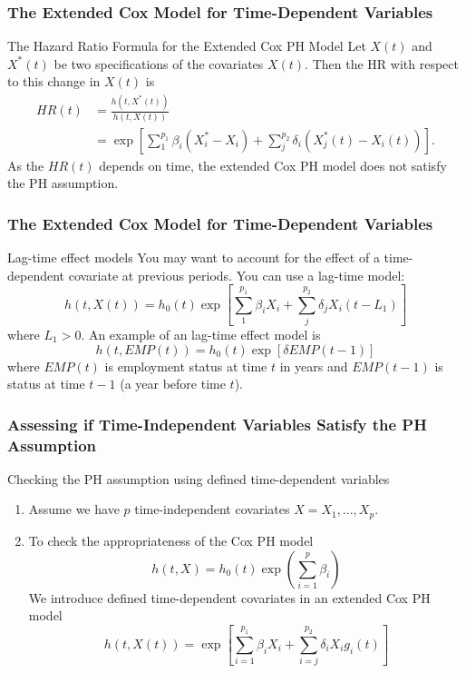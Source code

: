 \documentclass{beamer}
\theoremstyle{definition}
\begin{document}
\begin{frame}
\frametitle{The Extended Cox Model for Time-Dependent Variables}
\begin{block}{The Hazard Ratio Formula for the Extended Cox PH Model}
Let $X(t)$ and $X^*(t)$ be two specifications of the covariates $X(t)$. Then the HR with respect to this change in $X(t)$ is
\begin{align*}
HR(t) &= \frac{h(t,X^*(t))}{h(t,X(t))} \\
& = \exp\left[\sum_1^{p_1} \beta_i(X^*_i - X_i) + \sum_j^{p_2} \delta_i(X^*_j(t) - X_i(t))\right].
\end{align*}
As the $HR(t)$ depends on time, the extended Cox PH model does not satisfy the PH assumption.
\end{block}
\end{frame}


\begin{frame}
\frametitle{The Extended Cox Model for Time-Dependent Variables}
\begin{block}{Lag-time effect models}
You may want to account for the effect of a time-dependent covariate at previous periods. You can use a lag-time model:
\[
h(t,X(t)) = h_0(t) \exp\left[\sum_1^{p_1} \beta_i X_i + \sum_j^{p_2} \delta_j X_i(t-L_1)\right]
\]
where $L_1>0$.
An example of an lag-time effect model is
\[
h(t,EMP(t)) = h_0(t)\exp[\delta EMP(t-1)]
\]
where $EMP(t)$ is employment status at time $t$ in years and $EMP(t-1)$ is status at time $t-1$ (a year before time $t$).
\end{block}
\end{frame}

\begin{frame}
\frametitle{Assessing if Time-Independent Variables Satisfy the PH Assumption}
\begin{block}{Checking the PH assumption using defined time-dependent variables}
\begin{enumerate}
\item Assume we have $p$ time-independent covariates $X=X_1,\ldots,X_p$.
\item To check the appropriateness of the Cox PH model
\[
h(t,X) = h_0(t)\exp\left(\sum_{i=1}^p \beta_i\right) 
\]
We introduce defined time-dependent covariates in an extended Cox PH model
\[
h(t,X(t)) = \exp[\sum_{i=1}^{p_1} \beta_i X_i + \sum_{i=j}^{p_2} \delta_i X_i g_i(t)]
\]
\end{enumerate}
\end{block}
\end{frame}
\end{document}
